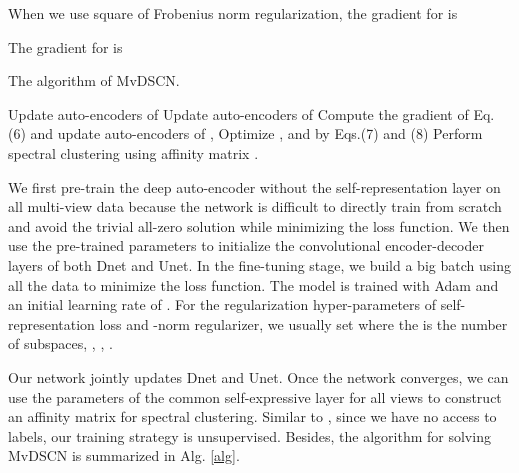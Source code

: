\documentclass[journal]{IEEEtran}
\begin{document}
When we use square of Frobenius norm regularization, the gradient for  is

The gradient for  is



\begin{algorithm}
	\caption{The algorithm of MvDSCN.}
	{
		Update auto-encoders of \;
		Update auto-encoders of \;
	}
	{
		Compute the gradient of Eq.(6) and update auto-encoders of ,  \;
		Optimize , and  by Eqs.(7) and (8)\;
	}
	Perform spectral clustering using affinity matrix \;	
	.
	\label{alg}
\end{algorithm}

We first pre-train the deep auto-encoder without the self-representation layer on all multi-view data because the network is difficult to directly train from scratch and avoid the trivial all-zero solution while minimizing the loss function.
We then use the pre-trained parameters to initialize the convolutional encoder-decoder layers of both Dnet and Unet.
In the fine-tuning stage, we build a big batch using all the data to minimize the loss function.
The model is trained with Adam \cite{Kingma2015AdamAM} and an initial learning rate of .
For the regularization hyper-parameters of self-representation loss and -norm regularizer, we usually set  where the  is the number of subspaces, , , .



Our network jointly updates Dnet and Unet.
Once the network converges, we can use the parameters of the common self-expressive layer for all views to construct an affinity matrix  for spectral clustering.
Similar to \cite{ji2017deep}, since we have no access to labels, our training strategy is unsupervised.
Besides, the algorithm for solving MvDSCN is summarized in Alg. \ref{alg}.
\end{document}
